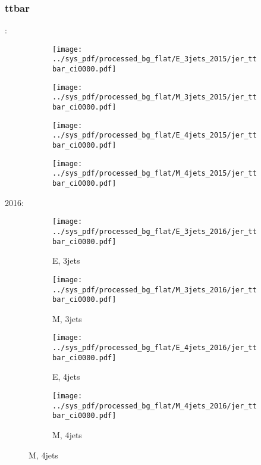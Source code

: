 \documentclass{beamer}
\begin{document}
\begin{frame}
\frametitle{ttbar}
\fontsize{5}{1}:
\begin{figure}
\centering
\begin{subfigure}[b]{0.24\textwidth}
\texttt{[image: ../sys\_pdf/processed\_bg\_flat/E\_3jets\_2015/jer\_ttbar\_ci0000.pdf]}
\end{subfigure}
\begin{subfigure}[b]{0.24\textwidth}
\texttt{[image: ../sys\_pdf/processed\_bg\_flat/M\_3jets\_2015/jer\_ttbar\_ci0000.pdf]}
\end{subfigure}
\begin{subfigure}[b]{0.24\textwidth}
\texttt{[image: ../sys\_pdf/processed\_bg\_flat/E\_4jets\_2015/jer\_ttbar\_ci0000.pdf]}
\end{subfigure}
\begin{subfigure}[b]{0.24\textwidth}
\texttt{[image: ../sys\_pdf/processed\_bg\_flat/M\_4jets\_2015/jer\_ttbar\_ci0000.pdf]}
\end{subfigure}
\end{figure}
2016:
\begin{figure}
\centering
\begin{subfigure}[b]{0.24\textwidth}
\texttt{[image: ../sys\_pdf/processed\_bg\_flat/E\_3jets\_2016/jer\_ttbar\_ci0000.pdf]}
\captionsetup{font=tiny}
\caption{E, 3jets}
\end{subfigure}
\begin{subfigure}[b]{0.24\textwidth}
\texttt{[image: ../sys\_pdf/processed\_bg\_flat/M\_3jets\_2016/jer\_ttbar\_ci0000.pdf]}
\captionsetup{font=tiny}
\caption{M, 3jets}
\end{subfigure}
\begin{subfigure}[b]{0.24\textwidth}
\texttt{[image: ../sys\_pdf/processed\_bg\_flat/E\_4jets\_2016/jer\_ttbar\_ci0000.pdf]}
\captionsetup{font=tiny}
\caption{E, 4jets}
\end{subfigure}
\begin{subfigure}[b]{0.24\textwidth}
\texttt{[image: ../sys\_pdf/processed\_bg\_flat/M\_4jets\_2016/jer\_ttbar\_ci0000.pdf]}
\captionsetup{font=tiny}
\caption{M, 4jets}
\end{subfigure}
\end{figure}
\end{frame}
\end{document}
